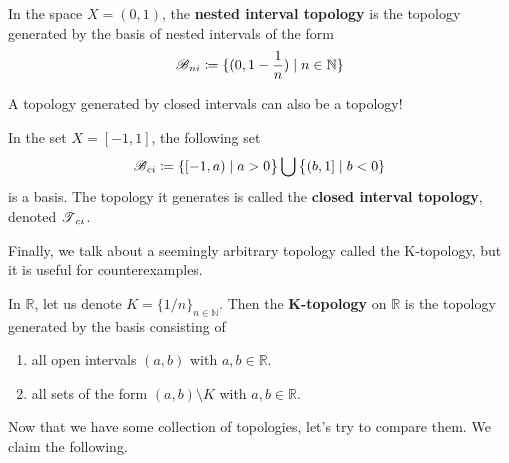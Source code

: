   \begin{example}
    \label{ex:nested-interval-topology}
    In the space $X = (0,1)$, the \textbf{nested interval topology} is the topology generated by the basis of nested intervals of the form 
    \begin{equation}
      \operatorname{\mathscr{B}}_{ni} \coloneqq \{ (0, 1-\frac{1}{n}) \mid n \in \mathbb{N} \}
    \end{equation}
  \end{example}

  A topology generated by closed intervals can also be a topology! 

  \begin{example}
    \label{ex:closed-interval-topology}
    In the set $X = [-1, 1]$, the following set 
    \begin{equation}
      \operatorname{\mathscr{B}}_{ci} \coloneqq \{ [-1, a) \mid a > 0 \big\} \bigcup \big\{ (b, 1] \mid b<0 \}
    \end{equation}
    is a basis. The topology it generates is called the \textbf{closed interval topology}, denoted $\operatorname{\mathscr{T}}_{ci}$. 
  \end{example}

  Finally, we talk about a seemingly arbitrary topology called the K-topology, but it is useful for counterexamples.   

  \begin{example}[K-Topology]
    \label{ex:k-topology}
    In $\mathbb{R}$, let us denote $K = \{1/n\}_{n \in \mathbb{N}}$. Then the \textbf{K-topology} on $\mathbb{R}$ is the topology generated by the basis consisting of 
    \begin{enumerate}
      \item all open intervals $(a, b)$ with $a, b \in \mathbb{R}$. 
      \item all sets of the form $(a, b) \setminus K$ with $a, b \in \mathbb{R}$. 
    \end{enumerate}
  \end{example} 

  Now that we have some collection of topologies, let's try to compare them. We claim the following. 

